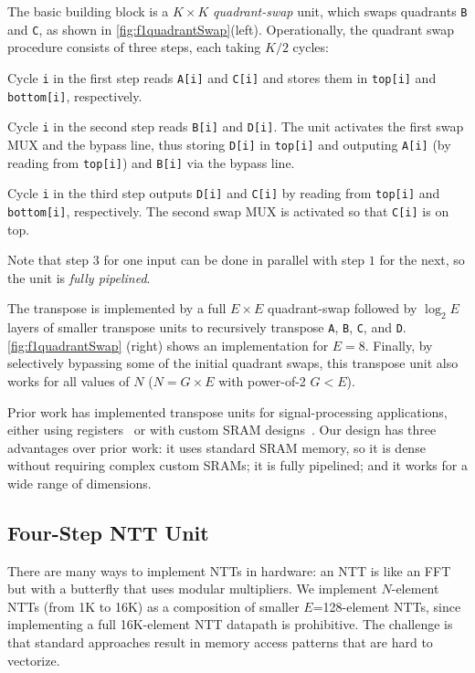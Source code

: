 The basic building block is a $K \times K$ \textit{quadrant-swap} unit, which
swaps quadrants \texttt{B} and \texttt{C}, as shown in
\autoref{fig:f1quadrantSwap}(left). Operationally, the quadrant swap procedure
consists of three steps, each taking $K/2$ cycles:
\begin{compactenum}
\item Cycle \texttt{i} in the first step reads \texttt{A[i]} and \texttt{C[i]}
    and stores them in \texttt{top[i]} and \texttt{bottom[i]}, respectively.
\item Cycle \texttt{i} in the second step reads \texttt{B[i]} and
    \texttt{D[i]}. The unit activates the first swap MUX and the bypass line,
    thus storing \texttt{D[i]} in \texttt{top[i]} and outputing \texttt{A[i]}
    (by reading from \texttt{top[i]}) and \texttt{B[i]} via the bypass line.
\item Cycle \texttt{i} in the third step outputs \texttt{D[i]} and
    \texttt{C[i]} by reading from \texttt{top[i]} and \texttt{bottom[i]},
    respectively. The second swap MUX is activated so that \texttt{C[i]} is on
    top.
\end{compactenum}

Note that step $3$ for one input can be done in parallel with step $1$ for the
next, so the unit is \emph{fully pipelined}.

The transpose is implemented by a full $E \times E$ quadrant-swap followed by
$\log_2E$ layers of smaller transpose units to recursively transpose
\texttt{A}, \texttt{B}, \texttt{C}, and \texttt{D}.
\autoref{fig:f1quadrantSwap} (right) shows an implementation for $E=8$.
Finally, by selectively bypassing some of the initial quadrant swaps, this
transpose unit also works for all values of $N$ ($N=G\times E$ with power-of-2
$G < E$).

Prior work has implemented transpose units for signal-processing applications,
either using registers~\cite{wang2018pipelined,zhang2020novel} or with custom
SRAM designs~\cite{shang2014single}. Our design has three advantages over prior
work: it uses standard SRAM memory, so it is dense without requiring complex
custom SRAMs; it is fully pipelined; and it works for a wide range of
dimensions.

\subsection{Four-Step NTT Unit}\label{sec:fourStepNTT}

There are many ways to implement NTTs in hardware: an NTT is like an
FFT~\cite{cooley:moc65:algorithm} but with a butterfly that uses modular
multipliers. We implement $N$-element NTTs (from 1K to 16K) as a composition of
smaller $E$=128-element NTTs, since implementing a full 16K-element NTT
datapath is prohibitive. The challenge is that standard approaches result in
memory access patterns that are hard to vectorize.

